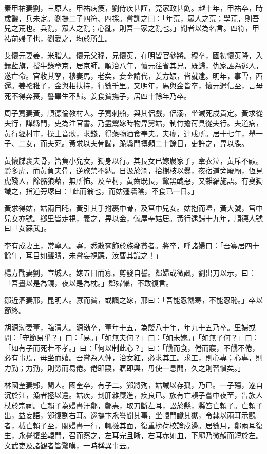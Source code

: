 \begin{pinyinscope}
秦甲祐妻劉，三原人。甲祐病瘓，劉侍疾甚謹，筦家政甚飭。越十年，甲祐卒，時歲饑，兵未定。劉撫二子四符、四採。嘗訓之曰：「年荒，眾人之荒；學荒，則吾兒之荒也。兵亂，眾人之亂；心亂，則吾一家之亂也。」聞者以為名言。四符，甲祐前婦子也，劉愛之，均於所生。

艾懷元妻姜，米脂人。懷元父穆，兄懷英，在明皆官參將。穆卒，國初懷英降，入鑲藍旗，授牛錄章京，居京師。順治八年，懷元往省其兄，既歸，仇家誣為逃人，遂亡命。官收其孥，穆妻馬，老矣，妾金請代，姜方娠，皆就逮。明年，事雪，西還。姜襁稚子，金與相扶持，行數千里。又明年，馬與金皆卒，懷元遣信至，言母死不得奔喪，誓畢生不歸。姜食貧撫子，居四十餘年乃卒。

周子寬妻黃，順德倫教村人。子寬刺船，與其侶戲，侶溺，坐減死戍貴定。黃求從夫行，譁縣門，吏為注官書。乃盡鬻嫁時物畀舅姑，制竹擔荷具從夫行。夫道病，黃行經村市，操土音歌，求錢，得藥物酒食奉夫。夫瘳，達戍所。居十七年，舉一子、二女，而夫死。黃求以夫骨歸，跪縣門搏顙二十餘日，吏許之，畀以牒。

黃懷牒裹夫骨，筥負小兒女，獨身以行。其長女已嫁農家子，牽衣泣，黃斥不顧。黔多虎，而黃負夫骨，逆旅禁不納。日汲於澗，拾樹枝以爨，夜宿道旁廢廟，恆見虎殘人，餘骼狼藉，無所怖。及至村，黃齒既長，黧黑醜惡，又雜羅施語。有叟獨識之，指道旁塚曰：「此而翁也，而姑殭墻陰，不食已一日。」

黃求得姑，姑兩目眊，黃引其手拊裹中骨，及筥中兒女。姑抱而噎，黃大號，筥中兒女亦號。鄉里皆走視，義之，畀以金，僦屋奉姑居。黃行逮歸十九年，順德人號曰「女蘇武」。

李有成妻王，常寧人。寡，悉散奩飾於族鄰貧者。將卒，呼諸婦曰：「吾寡居四十餘年，耳目如聾瞶，未嘗妄視聽，汝曹其識之！」

楊方勖妻劉，宣城人。嫁五日而寡，剪發自誓。鄰婦或微諷，劉出刀以示，曰：「吾晝以是為鏡，夜以是為枕。」鄰婦懾，不敢復言。

鄒近泗妻邢，昆明人。寡而貧，或諷之嫁，邢曰：「吾能忍饑寒，不能忍恥。」卒以節終。

胡源渤妻董，臨清人。源渤卒，董年十五，為嫠八十年，年九十五乃卒。里婦或問：「守節易乎？」曰：「易。」「如無夫何？」曰：「如未嫁。」「如無子何？」曰：「如有子而死若不孝。」曰：「何以制此心？」曰：「饑而食，倦而寢，不饑不倦，必有事焉，毋坐而嬉。吾嘗為人傭，治女紅，必求其工。求工，則心專；心專，則力勤；力勤，則勞而易倦。倦即寢，寤即興，毋使一息閒，久之則習慣矣。」

林國奎妻鄭，閩人。國奎卒，有子二。鄭將殉，姑誡以存孤，乃已。一子殤，遂自沉於江，漁者拯以還。姑疾，刲肝雜糜進，疾良已。族有亡賴子嘗中夜至，告族人杖於宗祠。亡賴子為嫚書汙鄭，鄭恚，取刀斷左耳，訟於縣，縣笞亡賴子。亡賴子出，益妄語，鄭復割右耳。巡撫卞永譽聞其事，坐轅門讞其獄，令隸以兩耳示觀者，械亡賴子至，閱嫚書一行，輒撻其面，復重榜荷校論戍邊。居數月，鄭兩耳復生，永譽復坐轅門，召而察之，左耳完且晰，右耳赤如血，下廓乃微赬而短於左。文武吏及諸觀者皆驚嘆，一時稱異事云。


\end{pinyinscope}
